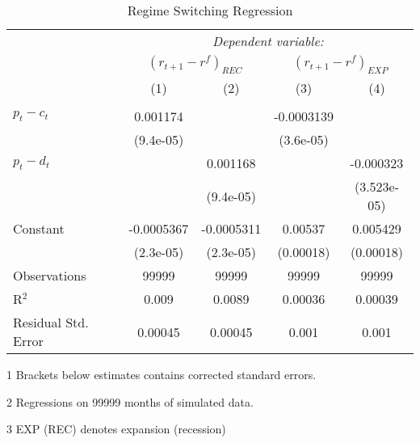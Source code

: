 \begin{table}[H]
\centering   
  \caption{Regime Switching Regression}           
  \label{tab:RSregress}     
  \begin{threeparttable}
\begin{tabular}{@{\hspace{5pt}}l@{\hspace{5pt}}cccc} 
\toprule 
 & \multicolumn{4}{c}{\textit{Dependent variable:}} \\ 
 & \multicolumn{2}{c}{$\left(r_{t+1}-r^f\right)_{REC}$} & \multicolumn{2}{c}{$\left(r_{t+1}-r^f\right)_{EXP}$} \\ 
 \cmidrule(rr){2-5}
 & (1)   &   (2) & (3) & (4) \\ 
\midrule  
\\[-2.1ex] $ p_t - c_t $ & 0.001174&  &-0.0003139   & \\ 
  & (9.4e-05) & &(3.6e-05) & \\ 
 \addlinespace 
 $p_t - d_t$ &  & 0.001168 & &-0.000323 \\
 & & (9.4e-05) & &(3.523e-05) \\
 \addlinespace 
 Constant &-0.0005367 &-0.0005311 &0.00537 &0.005429 \\ 
  &(2.3e-05) &(2.3e-05) &(0.00018) &(0.00018) \\ 
 \addlinespace 
\midrule  
Observations & 99999 & 99999 & 99999 &99999\\ 
R$^{2}$ &0.009 & 0.0089 & 0.00036 &0.00039\\ 
Residual Std. Error &0.00045 & 0.00045 &0.001 & 0.001  \\ 
\bottomrule 
\end{tabular} 
\begin{tablenotes}
\footnotesize{
\item[1] Brackets below estimates contains \citet{NW87} corrected standard errors. 
\item[2] Regressions on 99999 months of simulated data.
\item[3] EXP (REC) denotes expansion (recession)
}
\end{tablenotes}
\end{threeparttable}
\end{table} 
